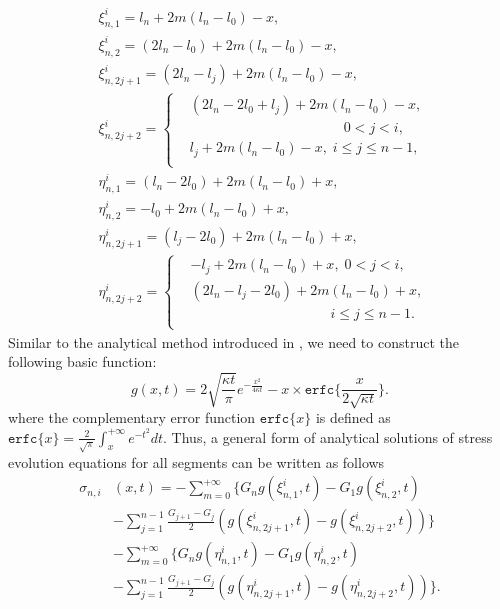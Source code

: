 \begin{equation} \label{generalNotations}
\begin{split}
&\xi_{n,1}^{i}=l_n+2m(l_n-l_0)-x,\\
&\xi_{n,2}^{i}=(2l_n-l_0)+2m(l_n-l_0)-x,\\
&\xi_{n,2j+1}^{i}=(2l_n-l_j)+2m(l_n-l_0)-x,\\
&\xi_{n,2j+2}^{i}=\left\{
   \begin{aligned}
   &(2l_n-2l_0+l_j)+2m(l_n-l_0)-x,\;\\
   &\qquad\qquad\qquad\qquad\qquad\quad 0<j<i,  \\
   &l_j+2m(l_n-l_0)-x,\;i\leq j\leq n-1, \\
      \end{aligned}
   \right. \\
&\eta_{n,1}^{i}=(l_n-2l_0)+2m(l_n-l_0)+x,\\
&\eta_{n,2}^{i}=-l_0+2m(l_n-l_0)+x,\\
&\eta_{n,2j+1}^{i}=(l_j-2l_0)+2m(l_n-l_0)+x,\\
&\eta_{n,2j+2}^{i}=\left\{
   \begin{aligned}
   &-l_j+2m(l_n-l_0)+x,\;0<j<i,  \\
   &(2l_n-l_j-2l_0)+2m(l_n-l_0)+x,\; \\
   &\qquad\qquad\qquad\qquad\qquad i\leq j \leq n-1. \\
   \end{aligned}
   \right.
\end{split}
\end{equation}
Similar to the analytical method introduced in \cite{?}, we need to construct the following basic function:
\begin{equation} \label{general_basisFunc}
g(x,t)=2\sqrt{\frac{\kappa t}{\pi}}e^{-\frac{x^2}{4\kappa
t}}-x\times\texttt{erfc}\{\frac{x}{2\sqrt{\kappa t}}\}.
\end{equation}
where the complementary error function $\texttt{erfc}\{x\}$ is defined as $\texttt{erfc}\{x\}=\frac{2}{\sqrt{\pi}}\int_x^{+\infty}e^{-t^2}dt$. Thus, a general form of analytical solutions of stress evolution equations for all segments can be written as follows
\begin{equation} \label{eq:general_solution}
\begin{split}
\sigma_{n,i}&(x,t)=-\sum\limits_{m=0}^{+\infty}\{G_ng(\xi_{n,1}^{i},t)-G_1g(\xi_{n,2}^{i},t)\\
&-\sum\limits_{j=1}^{n-1}\frac{G_{j+1}-G_j}{2}(g(\xi_{n,2j+1}^{i},t)-g(\xi_{n,2j+2}^{i},t))\}\\
&-\sum\limits_{m=0}^{+\infty}\{G_ng(\eta_{n,1}^{i},t)-G_1g(\eta_{n,2}^{i},t)\\
&-\sum\limits_{j=1}^{n-1}\frac{G_{j+1}-G_j}{2}(g(\eta_{n,2j+1}^{i},t)-g(\eta_{n,2j+2}^{i},t))\}.
 \end{split}
 \end{equation}

